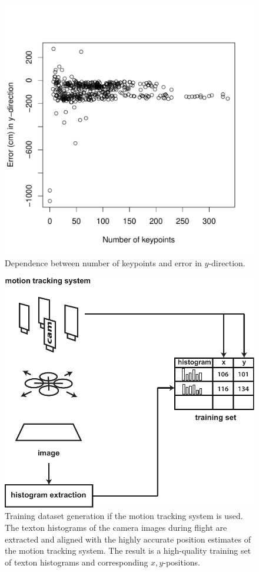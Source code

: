 \documentclass{report}
\begin{document}
\begin{figure}[h!]
\begin{center}
\includegraphics[width=0.448\columnwidth]{keypoints_error_y}
\caption{{Dependence between number of keypoints and error in $y$-direction.%
}}
\end{center}
\end{figure}

\begin{figure}[h!]
\begin{center}
\includegraphics[width=0.56\columnwidth]{overview_new}
\caption{{Training dataset generation if the motion tracking system is
    used. The texton histograms of the camera images during flight are
    extracted and aligned with the highly accurate position estimates
    of the motion tracking system. The result is a high-quality
    training set of texton histograms and corresponding
    $x,y$-positions.%
  }}
\end{center}
\end{figure}
\end{document}
